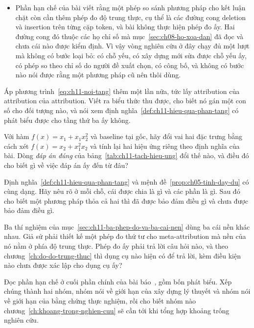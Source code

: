 \begin{tomtat}
\begin{itemize}
  \item Phần hạn chế của bài viết rằng một phép so sánh phương pháp cho kết
  luận chặt còn cần thêm phép đo độ trung thực, cụ thể là các đường cong
  deletion và insertion trên từng cặp token, và bài không thực hiện phép đo ấy.
  Hai đường cong đó thuộc các họ chỉ số mà mục~\ref{sec:ch08-ho-xoa-dan} đã đọc
  và chưa cái nào được kiểm định. Vì vậy vòng nghiên cứu ở đây chạy đủ một lượt
  mà không có bước loại bỏ: có chỗ yếu, có xây dựng mới sửa được chỗ yếu ấy, có
  phép so theo chỉ số do người đề xuất chọn, có công bố, và không có bước nào
  nói được rằng một phương pháp cũ nên thôi dùng.
\end{itemize}
\end{tomtat}

\cauhoi

\begin{cauhoids}
  \item Áp phương trình~\ref{eq:ch11-noi-tang} thêm một lần nữa, tức lấy
  attribution của attribution của attribution. Viết ra biểu thức thu được, cho
  biết nó gán một con số cho đối tượng nào, và nói xem
  định nghĩa~\ref{def:ch11-hieu-qua-phan-tang} có phát biểu được cho tầng thứ
  ba ấy không.

  \item Với hàm $f(x) = x_1 + x_1 x_2^2$ và baseline tại gốc, hãy đổi vai hai
  đặc trưng bằng cách xét $f(x) = x_2 + x_1^2 x_2$ và tính lại hai hiệu ứng
  riêng theo định nghĩa của bài. Dòng \emph{đáp án đúng} của
  bảng~\ref{tab:ch11-tach-hieu-ung} đổi thế nào, và điều đó cho biết gì về việc
  đáp án ấy đến từ đâu?

  \item Định nghĩa~\ref{def:ch11-hieu-qua-phan-tang} và
  mệnh đề~\ref{prop:ch05-tinh-day-du} có cùng dạng. Hãy nêu rõ ở mỗi chỗ, cái
  được chia là gì và các phần là gì. Sau đó cho biết một phương pháp thỏa cả
  hai thì đã được bảo đảm điều gì và chưa được bảo đảm điều gì.

  \item Ba thí nghiệm của mục~\ref{sec:ch11-ba-phep-do-va-ba-cai-nen} dùng ba
  cái nền khác nhau. Giả sử phải thiết kế một phép đo thứ tư cho
  meta-attribution mà nền của nó nằm ở phía độ trung thực. Phép đo ấy phải trả
  lời câu hỏi nào, và theo chương~\ref{ch:do-do-trung-thuc} thì dụng cụ nào
  hiện có để trả lời, kèm điều kiện nào chưa được xác lập cho dụng cụ ấy?

  \item Đọc phần hạn chế ở cuối phần chính của bài
  báo~\autocite{p23metagame}, gồm bốn phát biểu. Xếp chúng thành hai nhóm, nhóm
  nói về giới hạn của xây dựng lý thuyết và nhóm nói về giới hạn của bằng chứng
  thực nghiệm, rồi cho biết nhóm nào chương~\ref{ch:khoang-trong-nghien-cuu} sẽ
  cần tới khi tổng hợp khoảng trống nghiên cứu.
\end{cauhoids}
